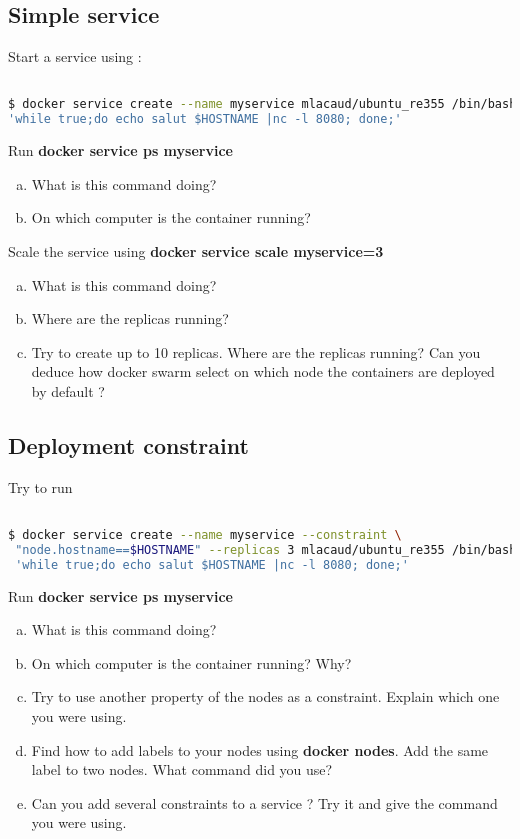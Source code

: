 \documentclass[a4paper,11pt]{exam}
\begin{document}
\subsection{Simple service}
Start a service using : 
\begin{lstlisting}[frame=single,language={sh}]  % Start your code-block

$ docker service create --name myservice mlacaud/ubuntu_re355 /bin/bash -c \
'while true;do echo salut $HOSTNAME |nc -l 8080; done;'

\end{lstlisting}

\begin{questions}
	\question Run \textbf{docker service ps myservice}
	\begin{enumerate}[(a)]
		\item What is this command doing?
		\item On which computer is the container running?
	\end{enumerate}
Scale the service using \textbf{docker service scale myservice=3}
	\begin{enumerate}[(c)]
		\item What is this command doing?
		\item Where are the replicas running?
		\item Try to create up to 10 replicas. Where are the replicas running? Can you deduce how docker swarm select on which node the containers are deployed by default ? 
	\end{enumerate}
\end{questions}

\subsection{Deployment constraint}

Try to run 
\begin{lstlisting}[frame=single,language={sh}]  % Start your code-block

$ docker service create --name myservice --constraint \
 "node.hostname==$HOSTNAME" --replicas 3 mlacaud/ubuntu_re355 /bin/bash -c \
 'while true;do echo salut $HOSTNAME |nc -l 8080; done;'
\end{lstlisting}

\begin{questions}
	\question Run \textbf{docker service ps myservice}
	\begin{enumerate}[(a)]
		\item What is this command doing?
		\item On which computer is the container running? Why?
		\item Try to use another property of the nodes as a constraint. Explain which one you were using.
		\item Find how to add labels to your nodes using \textbf{docker nodes}. Add the same label to two nodes. What command did you use?
		\item Can you add several constraints to a service ? Try it and give the command you were using.
	\end{enumerate}
\end{questions}
\end{document}
